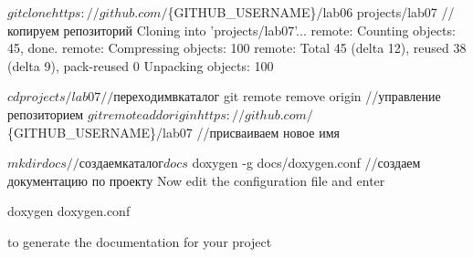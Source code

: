 \begin{DoxyCode}
$ git clone https://github.com/$\{GITHUB\_USERNAME\}/lab06 projects/lab07 //копируем репозиторий
Cloning into 'projects/lab07'...
remote: Counting objects: 45, done.
remote: Compressing objects: 100%
remote: Total 45 (delta 12), reused 38 (delta 9), pack-reused 0
Unpacking objects: 100%

$ cd projects/lab07 //переходим в каталог
$ git remote remove origin //управление репозиторием
$ git remote add origin https://github.com/$\{GITHUB\_USERNAME\}/lab07 //присваиваем новое имя
\end{DoxyCode}



\begin{DoxyCode}
$ mkdir docs //создаем каталог docs
$ doxygen -g docs/doxygen.conf //создаем документацию по проекту
Now edit the configuration file and enter

doxygen doxygen.conf

to generate the documentation for your project


\end{DoxyCode}
